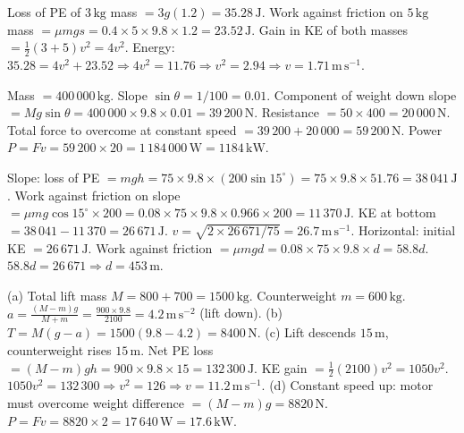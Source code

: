\documentclass[11pt]{article}
\begin{document}
\begin{corrige}[Exercise 1]
Loss of PE of $3\,\mathrm{kg}$ mass $= 3g(1.2) = 35.28\,\mathrm{J}$.
Work against friction on $5\,\mathrm{kg}$ mass $= \mu mg s = 0.4 \times 5 \times 9.8 \times 1.2 = 23.52\,\mathrm{J}$.
Gain in KE of both masses $= \frac{1}{2}(3+5)v^2 = 4v^2$.
Energy: $35.28 = 4v^2 + 23.52 \Rightarrow 4v^2 = 11.76 \Rightarrow v^2 = 2.94 \Rightarrow v = 1.71\,\mathrm{m\,s^{-1}}$.
\end{corrige}

\begin{corrige}[Exercise 2]
Mass $= 400\,000\,\mathrm{kg}$.  Slope $\sin\theta = 1/100 = 0.01$.
Component of weight down slope $= Mg\sin\theta = 400\,000 \times 9.8 \times 0.01 = 39\,200\,\mathrm{N}$.
Resistance $= 50 \times 400 = 20\,000\,\mathrm{N}$.
Total force to overcome at constant speed $= 39\,200 + 20\,000 = 59\,200\,\mathrm{N}$.
Power $P = Fv = 59\,200 \times 20 = 1\,184\,000\,\mathrm{W} = 1184\,\mathrm{kW}$.
\end{corrige}

\begin{corrige}[Exercise 3]
Slope: loss of PE $= mgh = 75 \times 9.8 \times (200\sin15^\circ) = 75 \times 9.8 \times 51.76 = 38\,041\,\mathrm{J}$.
Work against friction on slope $= \mu mg\cos15^\circ \times 200 = 0.08 \times 75 \times 9.8 \times 0.966 \times 200 = 11\,370\,\mathrm{J}$.
KE at bottom $= 38\,041 - 11\,370 = 26\,671\,\mathrm{J}$.
$v = \sqrt{2\times26\,671/75} = 26.7\,\mathrm{m\,s^{-1}}$.
Horizontal: initial KE $= 26\,671\,\mathrm{J}$.  Work against friction $= \mu mg d = 0.08 \times 75 \times 9.8 \times d = 58.8 d$.
$58.8 d = 26\,671 \Rightarrow d = 453\,\mathrm{m}$.
\end{corrige}

\begin{corrige}[Exercise 4]
(a) Total lift mass $M = 800 + 700 = 1500\,\mathrm{kg}$.  Counterweight $m = 600\,\mathrm{kg}$.
$a = \frac{(M-m)g}{M+m} = \frac{900 \times 9.8}{2100} = 4.2\,\mathrm{m\,s^{-2}}$ (lift down).
(b) $T = M(g-a) = 1500(9.8-4.2) = 8400\,\mathrm{N}$.
(c) Lift descends $15\,\mathrm{m}$, counterweight rises $15\,\mathrm{m}$.
Net PE loss $= (M-m)gh = 900 \times 9.8 \times 15 = 132\,300\,\mathrm{J}$.
KE gain $= \frac{1}{2}(2100)v^2 = 1050 v^2$.
$1050 v^2 = 132\,300 \Rightarrow v^2 = 126 \Rightarrow v = 11.2\,\mathrm{m\,s^{-1}}$.
(d) Constant speed up: motor must overcome weight difference $= (M-m)g = 8820\,\mathrm{N}$.
$P = Fv = 8820 \times 2 = 17\,640\,\mathrm{W} = 17.6\,\mathrm{kW}$.
\end{corrige}
\end{document}

